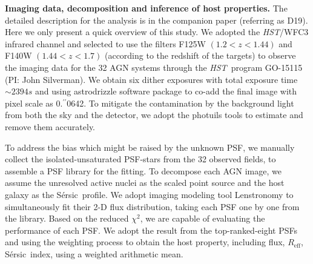 \documentclass{natureprintstyle}
\newcommand{\hst}{{\it HST}}
\newcommand{\mbh}{$\mathcal M_{\rm BH}$}
\newcommand{\halpha}{${\it H}\alpha$}
\newcommand{\hbeta}{${\it H}\beta$}
\newcommand{\sersic}{S\'ersic}
\newcommand{\lenstronomy}{{\sc Lenstronomy}}
\newcommand{\reff}{{$R_{\mathrm{eff}}$}}
\newcommand{\Mgii}{Mg$_{\rm II}$}
\newcommand{\Civ}{C$_{\rm IV}$}
\newcommand{\farcs}{\mbox{\ensuremath{.\!\!^{\prime\prime}}}}%
\begin{document}

\textbf{Imaging data, decomposition and inference of host properties.} 
The detailed description for the analysis is in the companion paper (referring as D19). Here we only present a quick overview of this study. We adopted the \hst/WFC3 infrared channel and selected to use the filters F125W $(1.2<z<1.44)$ and F140W $(1.44<z<1.7)$ (according to the redshift of the targets) to observe the imaging data for the 32 AGN systems through the \hst\ program GO-15115 (PI: John Silverman). We obtain six dither exposures with total exposure time $\sim2394s$ and using  {\sc astrodrizzle} software package to co-add the final image with pixel scale as 0\farcs0642. To mitigate the contamination by the background light from both the sky and the detector, we adopt the {\sc photuils} tools to estimate and remove them accurately.

To address the bias which might be raised by the unknown PSF, we manually collect the isolated-unsaturated PSF-stars from the 32 observed fields, to assemble a PSF library for the fitting. To decompose each AGN image, we assume the unresolved active nuclei as the scaled point source and the host galaxy as the \sersic\ profile. We adopt imaging modeling tool \lenstronomy\cite{lenstronomy} to simultaneously fit their 2-D flux distribution, taking each PSF one by one from the library. Based on the reduced $\chi^2$, we are capable of evaluating the performance of each PSF. We adopt the result from the top-ranked-eight PSFs and using the weighting process to obtain the host property, including flux, \reff, \sersic\ index, using a weighted arithmetic mean.
\end{document}
